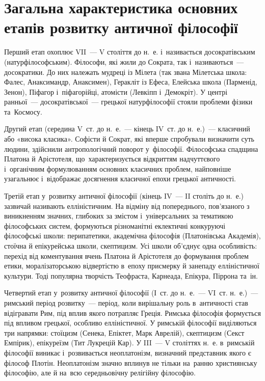 \documentclass[a5paper,oneside,DIV=12,12pt,headings=small]{scrartcl}
\begin{document}
	\section{Загальна характеристика  основних етапів  розвитку античної філософії}
		Перший етап охоплює VII~— V століття до н.~е. і~називається досократівським (натурфілософським). Філософи, які жили до Сократа, так і~називаються~— досократики. До них належать мудреці із Мілета (так звана Мілетська школа: Фалес, Анаксимандр, Анаксимен), Геракліт із Ефеса, Елейська школа (Парменід, Зенон), Піфагор і~піфагорійці, атомісти (Левкіпп і~Демокріт). У центрі ранньої~— досократівської~— грецької натурфілософії стояли проблеми фізики та~Космосу.
	
		Другий етап (середина V~ст. до н.~е.~— кінець IV~ст. до н.~е.)~— класичний або «висока класика». Софісти й Сократ, які вперше спробували визначити суть людини, здійснили антропологічний поворот у~філософії. Філософська спадщина Платона й Арістотеля, що~характеризується відкриттям надчуттєвого і~органічним формулюванням основних класичних проблем, найповніше узагальнює і~відображає досягнення класичної епохи грецької античності.
	
		Третій етап у~розвитку античної філософії (кінець IV~— II століть до н.~е.) зазвичай називають елліністичним. На відміну від попереднього, пов'язаного з виникненням значних, глибоких за змістом і~універсальних за тематикою філософських систем, формуються різноманітні еклектичні конкуруючі філософські школи: перипатетики, академічна філософія (Платонівська Академія), стоїчна й епікурейська школи, скептицизм. Усі школи об'єднує одна особливість: перехід від коментування вчень Платона й Арістотеля до формування проблем етики, моралізаторською відвертістю в~епоху присмерку й занепаду елліністичної культури. Тоді популярна творчість Теофраста, Карнеада, Епікура, Піррона та~ін.
	
		Четвертий етап у~розвитку античної філософії (І ст. до н.~е.~— VI ст. н.~е.)~— римський період розвитку~— період, коли вирішальну роль в~античності став відігравати Рим, під вплив якого потрапляє Греція. Римська філософія формується під впливом грецької, особливо елліністичної. У римській філософії виділяються три напрямки: стоїцизм (Сенека, Епіктет, Марк Аврелій), скептицизм (Секст Емпірик), епікуреїзм (Тит Лукрецій Кар). У III~— V століттях н.~е. в~римській філософії виникає і~розвивається неоплатонізм, визначний представник якого є філософ Плотін. Неоплатонізм значно вплинув не тільки на~ранню християнську філософію, але й на~всю середньовічну релігійну філософію.
		
\end{document}
